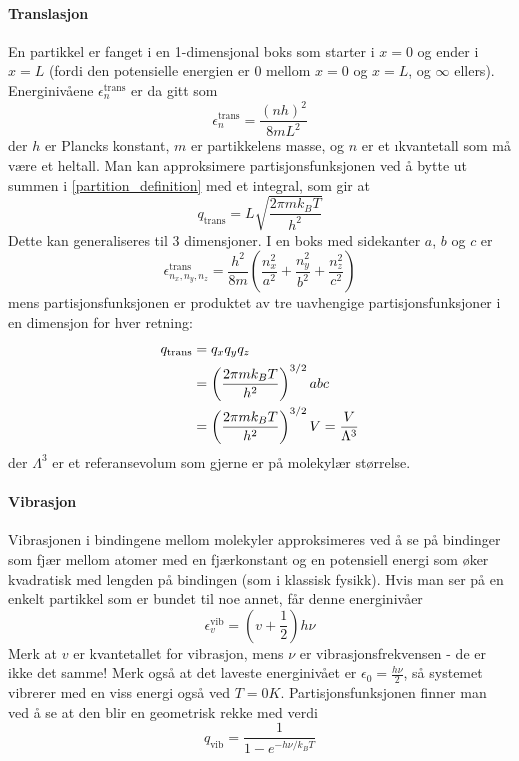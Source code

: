 \paragraph{Translasjon} En partikkel er fanget i en 1-dimensjonal boks som starter i $x=0$ og ender i $x=L$ (fordi den potensielle energien er 0 mellom $x=0$ og $x=L$, og $\infty$ ellers). Energinivåene $\epsilon_n^{\text{trans}}$ er da gitt som
\begin{equation}
	\epsilon_n^{\text{trans}}=\frac{(nh)^2}{8mL^2}
\end{equation}
der $h$ er Plancks konstant, $m$ er partikkelens masse, og $n$ er et \i{kvantetall} som må være et heltall. Man kan approksimere partisjonsfunksjonen ved å bytte ut summen i \eqref{partition_definition} med et integral, som gir at
\begin{equation}
	q_{\text{trans}}=L\sqrt{\frac{2\pi mk_BT}{h^2}}
\end{equation}
Dette kan generaliseres til 3 dimensjoner. I en boks med sidekanter $a$, $b$ og $c$ er 
\begin{equation}
	\epsilon_{n_x,n_y,n_z}^{\text{trans}}=\frac{h^2}{8m}\left(\frac{n_x^2}{a^2}+\frac{n_y^2}{b^2}+\frac{n_z^2}{c^2}\right)
\end{equation}
mens partisjonsfunksjonen er produktet av tre uavhengige partisjonsfunksjoner i en dimensjon for hver retning:
\begin{align}
\begin{split}
	q_{\text{\text{trans}}} &= q_xq_yq_z \\ &= \left(\frac{2\pi mk_BT}{h^2}\right)^{3/2}abc \\ &=\left(\frac{2\pi mk_BT}{h^2}\right)^{3/2}V=\frac{V}{\Lambda^3}
\end{split}
\end{align}
der $\Lambda^3$ er et referansevolum som gjerne er på molekylær størrelse.

\paragraph{Vibrasjon} Vibrasjonen i bindingene mellom molekyler approksimeres ved å se på bindinger som fjær mellom atomer med en fjærkonstant og en potensiell energi som øker kvadratisk med lengden på bindingen (som i klassisk fysikk). Hvis man ser på en enkelt partikkel som er bundet til noe annet, får denne energinivåer
\begin{equation}
	\epsilon_v^{\text{vib}}=\left(v+\frac{1}{2}\right)h\nu
\end{equation}
Merk at $v$ er kvantetallet for vibrasjon, mens $\nu$ er vibrasjonsfrekvensen - de er ikke det samme! Merk også at det laveste energinivået er $\epsilon_0=\frac{h\nu}{2}$, så systemet vibrerer med en viss energi også ved $T=0K$. Partisjonsfunksjonen finner man ved å se at den blir en geometrisk rekke med verdi
\begin{equation}
	q_{\text{vib}}=\frac{1}{1-e^{-h\nu/k_BT}}
\end{equation}

